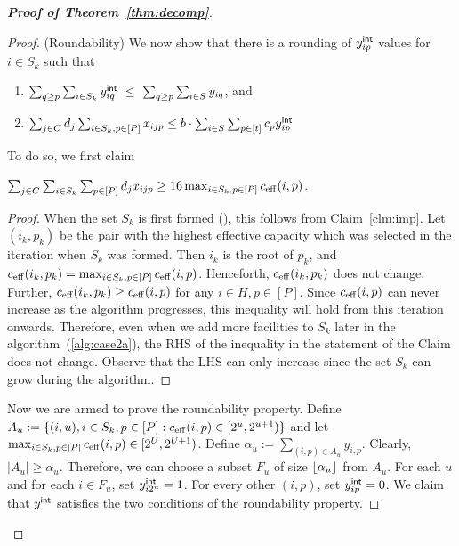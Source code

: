 \begin{proof}[{\bf Proof of Theorem~\ref{thm:decomp}}]
\begin{proof}
\noindent
(Roundability)
We now show that there is a rounding of $y^{{\mathsf{int}}}_{ip}$ values for $i\in S_k$ such that
		\begin{enumerate}
			\item $\sum_{q \geq p} \sum_{i\in S_k} y^{{\mathsf{int}}}_{iq} ~\leq~ \sum_{q \geq p}\sum_{i\in S} y_{iq}$, and
			\item $\sum_{j\in C} d_j \sum_{i\in S_k,p\in [P]} x_{ijp} \leq b\cdot \sum_{i\in S} \sum_{p\in [t]} c_py^{{\mathsf{int}}}_{ip}$
		\end{enumerate}
To do so, we first claim
\begin{claim}\label{clm:imp2}
	 $\sum_{j\in C}\sum_{i\in S_k}\sum_{p\in [P]} d_jx_{ijp} \geq 16\max_{i\in S_k,p\in [P]} c_{\mathrm{eff}}(i,p)$.
\end{claim}
\begin{proof}
	When the set $S_k$ is first formed (), this follows from Claim~\ref{clm:imp}. Let $(i_k, p_k)$ be the pair
	with the highest effective capacity which was selected in the iteration when $S_k$ was formed. Then $i_k$ is the
	root of $p_k$, and $c_{\mathrm{eff}}(i_k, p_k) = \max_{i\in S_k,p\in [P]} c_{\mathrm{eff}}(i,p)$. Henceforth, $c_{\mathrm{eff}}(i_k, p_k)$ does not 
	change. Further, $c_{\mathrm{eff}}(i_k, p_k) \geq c_{\mathrm{eff}}(i,p)$ for any $i \in H, p \in [P]$. Since $c_{\mathrm{eff}}(i,p)$ can never increase as the
	algorithm progresses, this inequality will hold from this iteration onwards. Therefore, even when we add more facilities
	to $S_k$ later in the algorithm~(\cref{alg:case2a}), the RHS of the inequality in the statement of the Claim does not change. 
	Observe that the LHS can only increase since the set $S_k$ can grow during the algorithm. 
\end{proof}

\noindent
Now we are armed to prove the roundability property. Define $A_u := \{(i,u), i\in S_k,p\in [P]: c_{\mathrm{eff}}(i,p) \in [2^u,2^{u+1})\}$ and let $\max_{i\in S_k,p\in [P]} c_{\mathrm{eff}}(i,p) \in [2^U,2^{U+1})$.
Define $\alpha_u := \sum_{(i,p) \in A_u} y_{i,p}$. Clearly, $|A_u| \geq \alpha_u$. Therefore, we can choose a subset $F_u$ of size $\lfloor\alpha_u\rfloor$
from $A_u$. 
For each $u$ and for each $i\in F_u$, set $y^{{\mathsf{int}}}_{i2^u} = 1$. For every other $(i,p)$, set $y^{{\mathsf{int}}}_{ip} = 0$. We claim that $y^{{\mathsf{int}}}$ 
satisfies the two conditions of the roundability property. 


\end{proof}
\end{proof}
